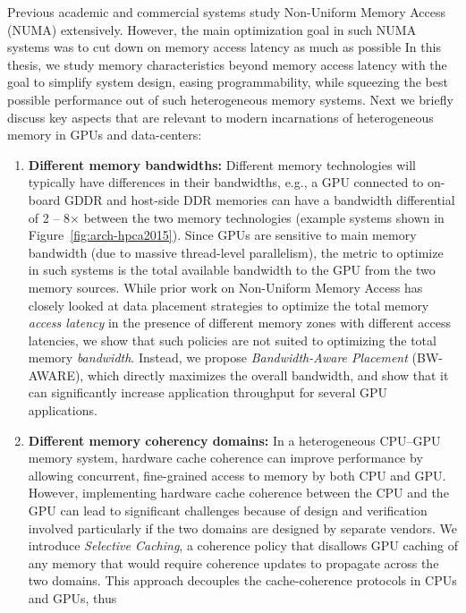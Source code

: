 Previous academic and commercial systems study Non-Uniform Memory Access (NUMA)
extensively. However, the main optimization goal in such NUMA systems was to cut
down on memory access latency as much as possible  In this thesis, we study memory characteristics
beyond memory access latency with the goal to simplify system design, easing
programmability, while squeezing the best possible performance out
of such heterogeneous memory systems.  Next we briefly discuss key aspects that
are relevant to modern incarnations of heterogeneous memory in GPUs and
data-centers:

\begin{enumerate}
\item
\textbf{Different memory bandwidths:}
Different memory technologies will typically have differences in their
bandwidths, e.g., a GPU connected to on-board GDDR and host-side DDR memories
can have a bandwidth differential of 2 -- 8$\times$ between the two
memory technologies (example systems shown in Figure~\ref{fig:arch-hpca2015}).
Since GPUs are sensitive to main memory bandwidth (due to massive thread-level
parallelism), the metric to optimize in such systems is the total available
bandwidth to the GPU from the two memory sources. While prior work on
Non-Uniform Memory Access has closely looked at data placement strategies
to optimize the total memory {\it access latency} in the presence of different
memory zones with different access latencies, we show that such policies are not
suited to optimizing the total memory {\it bandwidth}. Instead, we propose {\it
Bandwidth-Aware Placement} (BW-AWARE), which directly maximizes the overall
bandwidth, and show that it can significantly increase application throughput
for several GPU applications.

\item
\textbf{Different memory coherency domains:} 
In a heterogeneous CPU--GPU memory system, hardware cache coherence can improve
performance by allowing concurrent, fine-grained access to memory by both CPU
and GPU.  However, implementing hardware cache coherence between the CPU and the
GPU can lead to significant challenges because of design and verification
involved particularly if the two domains are designed by separate vendors. We
introduce {\it Selective Caching}, a coherence policy that disallows GPU caching
of any memory that would require coherence updates to propagate across the two
domains. This approach decouples the cache-coherence protocols in CPUs and GPUs,
thus 


\end{enumerate}
